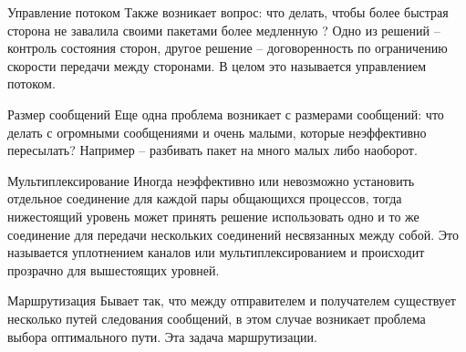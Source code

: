 \begin{frame}{Управление потоком}
	Также возникает вопрос: что делать,  чтобы более быстрая сторона не завалила своими пакетами более медленную ? Одно из решений – контроль состояния сторон,  другое решение – договоренность по ограничению скорости передачи между сторонами. В целом это называется управлением потоком.
\end{frame}

\begin{frame}{Размер сообщений}
Еще одна проблема возникает с размерами сообщений: что делать с огромными сообщениями и очень малыми,  которые неэффективно пересылать?
Например -- разбивать пакет на много малых либо наоборот.
\end{frame}

\begin{frame}{Мультиплексирование}
	Иногда неэффективно или невозможно установить отдельное соединение для каждой пары общающихся процессов,  тогда нижестоящий уровень может принять решение использовать одно и то же соединение для передачи нескольких соединений несвязанных между собой. Это называется уплотнением каналов или мультиплексированием и происходит прозрачно для вышестоящих уровней.
\end{frame}

\begin{frame}{Маршрутизация}
	Бывает так,  что между отправителем и получателем существует несколько путей следования сообщений,  в этом случае возникает проблема выбора оптимального пути. Эта задача маршрутизации.
\end{frame}



